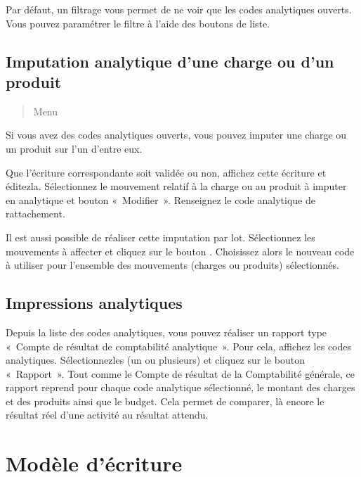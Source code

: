 \documentclass[a4paper,10pt,oneside,french]{sphinxmanual}
\begin{document}
Par défaut, un filtrage vous permet de ne voir que  les codes analytiques ouverts. Vous pouvez paramétrer le filtre à l’aide des boutons de liste.


\subsection{Imputation analytique d’une charge ou d’un produit}
\label{\detokenize{accounting/costaccounting:imputation-analytique-d-une-charge-ou-d-un-produit}}\begin{quote}

Menu 
\end{quote}

Si vous avez des codes analytiques ouverts, vous pouvez imputer une charge ou un produit sur l’un d’entre eux.
\begin{quote}

\noindent{}
\end{quote}

Que l’écriture correspondante soit validée ou non, affichez cette écriture  et éditez\sphinxhyphen{}la.
Sélectionnez le  mouvement relatif à la charge ou au produit à imputer en analytique et bouton « Modifier ».
Renseignez le code analytique de rattachement.

Il est aussi possible de réaliser cette imputation par lot.
Sélectionnez les mouvements à affecter et cliquez sur le bouton . Choisissez alors le nouveau code à utiliser
pour l’ensemble des mouvements (charges ou  produits) sélectionnés.


\subsection{Impressions analytiques}
\label{\detokenize{accounting/costaccounting:impressions-analytiques}}
Depuis la liste des codes analytiques, vous pouvez réaliser un rapport type « Compte de résultat de comptabilité analytique ».
Pour cela, affichez les codes analytiques. Sélectionnez\sphinxhyphen{}les (un ou plusieurs) et cliquez sur le bouton « Rapport ».
Tout comme le Compte de résultat de la Comptabilité générale, ce rapport reprend pour chaque code analytique sélectionné, le montant des charges et des produits ainsi que le budget. Cela permet de comparer, là encore le résultat réel d’une activité au résultat attendu.


\section{Modèle d’écriture}
\label{\detokenize{accounting/model:modele-d-ecriture}}\label{\detokenize{accounting/model::doc}}
\end{document}
